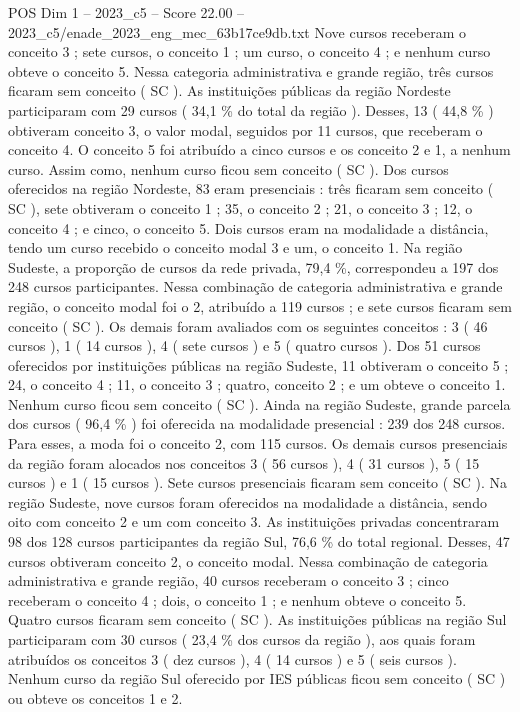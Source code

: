 \begin{textsample}{POS Dim 1 – 2023\_c5 – Score 22.00 – 2023\_c5/enade\_2023\_eng\_mec\_63b17ce9db.txt}
Nove cursos receberam o conceito 3 ; sete cursos, o conceito 1 ; um curso, o conceito 4 ; e nenhum curso obteve o conceito 5.
Nessa categoria administrativa e grande região, três cursos ficaram sem conceito ( SC ).
As instituições públicas da região Nordeste participaram com 29 cursos ( 34,1 \% do total da região ).
Desses, 13 ( 44,8 \% ) obtiveram conceito 3, o valor modal, seguidos por 11 cursos, que receberam o conceito 4.
O conceito 5 foi atribuído a cinco cursos e os conceito 2 e 1, a nenhum curso.
Assim como, nenhum curso ficou sem conceito ( SC ).
Dos cursos oferecidos na região Nordeste, 83 eram presenciais : três ficaram sem conceito ( SC ), sete obtiveram o conceito 1 ; 35, o conceito 2 ; 21, o conceito 3 ; 12, o conceito 4 ; e cinco, o conceito 5.
Dois cursos eram na modalidade a distância, tendo um curso recebido o conceito modal 3 e um, o conceito 1.
Na região Sudeste, a proporção de cursos da rede privada, 79,4 \%, correspondeu a 197 dos 248 cursos participantes.
Nessa combinação de categoria administrativa e grande região, o conceito modal foi o 2, atribuído a 119 cursos ; e sete cursos ficaram sem conceito ( SC ).
Os demais foram avaliados com os seguintes conceitos : 3 ( 46 cursos ), 1 ( 14 cursos ), 4 ( sete cursos ) e 5 ( quatro cursos ).
Dos 51 cursos oferecidos por instituições públicas na região Sudeste, 11 obtiveram o conceito 5 ; 24, o conceito 4 ; 11, o conceito 3 ; quatro, conceito 2 ; e um obteve o conceito 1.
Nenhum curso ficou sem conceito ( SC ).
Ainda na região Sudeste, grande parcela dos cursos ( 96,4 \% ) foi oferecida na modalidade presencial : 239 dos 248 cursos.
Para esses, a moda foi o conceito 2, com 115 cursos.
Os demais cursos presenciais da região foram alocados nos conceitos 3 ( 56 cursos ), 4 ( 31 cursos ), 5 ( 15 cursos ) e 1 ( 15 cursos ).
Sete cursos presenciais ficaram sem conceito ( SC ).
Na região Sudeste, nove cursos foram oferecidos na modalidade a distância, sendo oito com conceito 2 e um com conceito 3.
As instituições privadas concentraram 98 dos 128 cursos participantes da região Sul, 76,6 \% do total regional.
Desses, 47 cursos obtiveram conceito 2, o conceito modal.
Nessa combinação de categoria administrativa e grande região, 40 cursos receberam o conceito 3 ; cinco receberam o conceito 4 ; dois, o conceito 1 ; e nenhum obteve o conceito 5.
Quatro cursos ficaram sem conceito ( SC ).
As instituições públicas na região Sul participaram com 30 cursos ( 23,4 \% dos cursos da região ), aos quais foram atribuídos os conceitos 3 ( dez cursos ), 4 ( 14 cursos ) e 5 ( seis cursos ).
Nenhum curso da região Sul oferecido por IES públicas ficou sem conceito ( SC ) ou obteve os conceitos 1 e 2.

\end{textsample}

